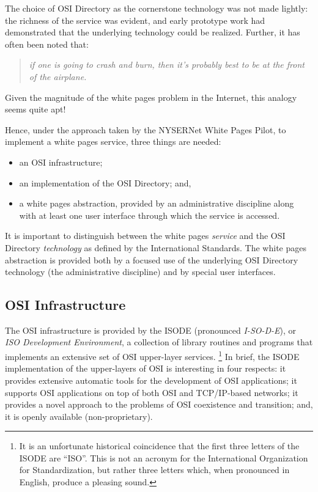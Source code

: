 The choice of OSI Directory as the cornerstone technology was not made
lightly: 
the richness of the service was evident,
and early prototype work had demonstrated that the underlying technology could
be realized.
Further,
it has often been noted that:
\begin{quote}\em
if one is going to crash and burn,
then it's probably best to be at the front of the airplane.
\end{quote}
Given the magnitude of the white pages problem in the Internet,
this analogy seems quite apt!

Hence,
under the approach taken by the NYSERNet White Pages Pilot,
to implement a white pages service,
three things are needed:
\begin{itemize}
\item	an OSI infrastructure;

\item	an implementation of the OSI Directory;
	and,

\item	a white pages abstraction,
	provided by an administrative discipline along with at least one user
	interface through which the service is accessed.
\end{itemize}
It is important to distinguish between the white pages {\em service\/} and the
OSI Directory {\em technology} as defined by the International Standards.
The white pages abstraction is provided both by a focused use of the
underlying OSI Directory technology (the administrative discipline)
and by special user interfaces.

\subsection	{OSI Infrastructure}
The OSI infrastructure is provided by the ISODE (pronounced {\em I-SO-D-E\/}),
or {\em ISO Development Environment}, a collection of library
routines and programs that implements an extensive set of OSI upper-layer
services.%
\footnote{It is an unfortunate historical coincidence that the first three
letters of the ISODE are ``ISO''.
This is not an acronym for the International Organization for Standardization,
but rather three letters which,
when pronounced in English,
produce a pleasing sound.}
In brief,
the ISODE implementation of the upper-layers of OSI is interesting in four
respects:
it provides extensive automatic tools for the development of OSI applications;
it supports OSI applications on top of both OSI and TCP/IP-based networks;
it provides a novel approach to the problems of OSI coexistence
and transition;
and,
it is openly available (non-proprietary).

